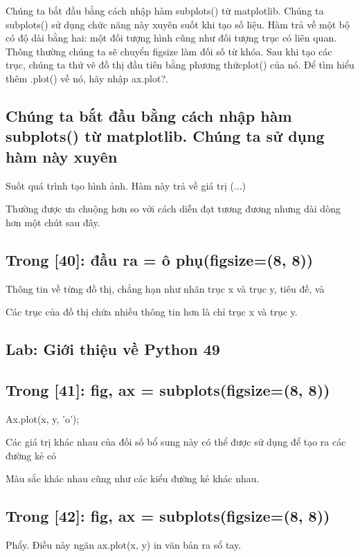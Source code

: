 Chúng ta bắt đầu bằng cách nhập hàm subplots() từ matplotlib. Chúng ta subplots() sử dụng chức năng này xuyên suốt khi tạo số liệu. Hàm trả về một bộ có độ dài bằng hai: một đối tượng hình cũng như đối tượng trục có liên quan. Thông thường chúng ta sẽ chuyển figsize làm đối số từ khóa. Sau khi tạo các trục, chúng ta thử vẽ đồ thị đầu tiên bằng phương thứcplot() của nó. Để tìm hiểu thêm .plot() về nó, hãy nhập ax.plot?.

\subsection{Chúng ta bắt đầu bằng cách nhập hàm subplots() từ matplotlib. Chúng ta sử dụng hàm này xuyên}

Suốt quá trình tạo hình ảnh. Hàm này trả về giá trị (...)

Thường được ưa chuộng hơn so với cách diễn đạt tương đương nhưng dài dòng hơn một chút sau đây.

\subsection{Trong [40]: đầu ra = ô phụ(figsize=(8, 8))}

Thông tin về từng đồ thị, chẳng hạn như nhãn trục x và trục y, tiêu đề, và

Các trục của đồ thị chứa nhiều thông tin hơn là chỉ trục x và trục y.

\subsection{Lab: Giới thiệu về Python 49}

\subsection{Trong [41]: fig, ax = subplots(figsize=(8, 8))}

Ax.plot(x, y, 'o');

Các giá trị khác nhau của đối số bổ sung này có thể được sử dụng để tạo ra các đường kẻ có

Màu sắc khác nhau cũng như các kiểu đường kẻ khác nhau.

\subsection{Trong [42]: fig, ax = subplots(figsize=(8, 8))}

Phẩy. Điều này ngăn ax.plot(x, y) in văn bản ra sổ tay.

